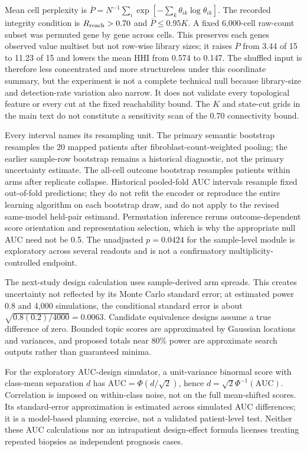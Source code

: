 \documentclass[10pt,a4paper]{article}
\begin{document}
Mean cell perplexity is $\overline P=N^{-1}\sum_i\exp[-\sum_k\theta_{ik}\log\theta_{ik}]$. The recorded integrity condition is $R_{\rm reach}>0.70$ and $\overline P\leq0.95K$. A fixed 6,000-cell raw-count subset was permuted gene by gene across cells. This preserves each gene\textquotesingle{}s observed value multiset but not row-wise library sizes; it raises $\overline P$ from 3.44 of 15 to 11.23 of 15 and lowers the mean HHI from 0.574 to 0.147. The shuffled input is therefore less concentrated and more structureless under this coordinate summary, but the experiment is not a complete technical null because library-size and detection-rate variation also narrow. It does not validate every topological feature or every cut at the fixed reachability bound. The $K$ and state-cut grids in the main text do not constitute a sensitivity scan of the 0.70 connectivity bound.

Every interval names its resampling unit. The primary semantic bootstrap resamples the 20 mapped patients after fibroblast-count-weighted pooling; the earlier sample-row bootstrap remains a historical diagnostic, not the primary uncertainty estimate. The all-cell outcome bootstrap resamples patients within arms after replicate collapse. Historical pooled-fold AUC intervals resample fixed out-of-fold predictions; they do not refit the encoder or reproduce the entire learning algorithm on each bootstrap draw, and do not apply to the revised same-model held-pair estimand. Permutation inference reruns outcome-dependent score orientation and representation selection, which is why the appropriate null AUC need not be 0.5. The unadjusted $p=0.0424$ for the sample-level module is exploratory across several readouts and is not a confirmatory multiplicity-controlled endpoint.

The next-study design calculation uses sample-derived arm spreads. This creates uncertainty not reflected by its Monte Carlo standard error; at estimated power 0.8 and 4,000 simulations, the conditional standard error is about $\sqrt{0.8(0.2)/4000}=0.0063$. Candidate equivalence designs assume a true difference of zero. Bounded topic scores are approximated by Gaussian locations and variances, and proposed totals near 80\% power are approximate search outputs rather than guaranteed minima.

For the exploratory AUC-design simulator, a unit-variance binormal score with class-mean separation $d$ has $\mathrm{AUC}=\Phi(d/\sqrt2)$, hence $d=\sqrt2\Phi^{-1}(\mathrm{AUC})$. Correlation is imposed on within-class noise, not on the full mean-shifted scores. Its standard-error approximation is estimated across simulated AUC differences; it is a model-based planning exercise, not a validated patient-level test. Neither these AUC calculations nor an intrapatient design-effect formula licenses treating repeated biopsies as independent prognosis cases.
\end{document}
